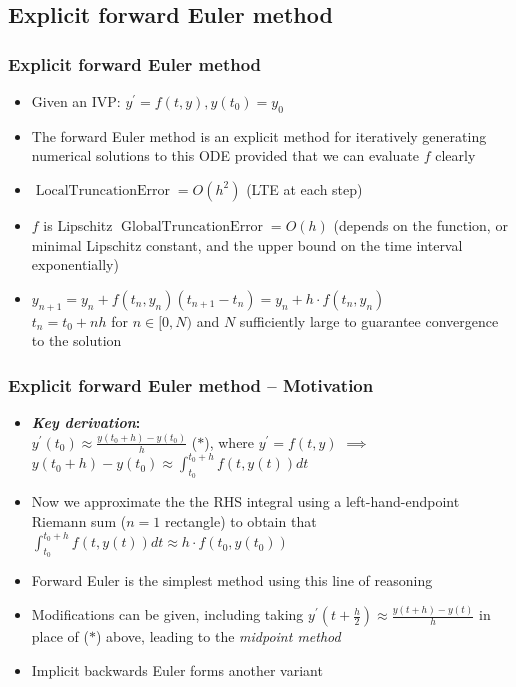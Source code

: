 \documentclass[usenames,svgnames,dvipsnames,10pt]{beamer}
\begin{document}
\subsection{Explicit forward Euler method}

\begin{frame}
\frametitle{Explicit forward Euler method}

\begin{itemize} 

\item Given an IVP: $y^{\prime} = f(t, y), y(t_0) = y_0$ 
\item The forward Euler method is an explicit method for iteratively 
      generating numerical solutions to this ODE provided that we can 
      evaluate $f$ clearly 
\item $\operatorname{LocalTruncationError} = O(h^2)$ (LTE at each step) 
\item $f$ is Lipschitz $\operatorname{GlobalTruncationError} = O(h)$ 
       (depends on the function, or minimal Lipschitz constant, and the upper bound on the 
       time interval exponentially) 
\item $y_{n+1} = y_n + f(t_n, y_n) \left(t_{n+1} - t_n\right) = y_n + h \cdot f(t_n, y_n)$ \\ 
      $t_n = t_0 + nh$ for $n \in [0, N)$ and $N$ sufficiently large to guarantee convergence 
      to the solution 

\end{itemize} 

\end{frame}

\begin{frame}
\frametitle{Explicit forward Euler method -- Motivation}

\begin{itemize} 

\item \textbf{\emph{Key derivation}:} \\ 
      $y^{\prime}(t_0) \approx \frac{y(t_0+h)-y(t_0)}{h}$ ($\ast$), where 
      $y^{\prime} = f(t, y)$ $\implies$ $y(t_0+h)-y(t_0) \approx \int_{t_0}^{t_0+h} f(t, y(t)) dt$ 
\item Now we approximate the the RHS integral using a left-hand-endpoint Riemann sum ($n=1$ rectangle) to 
      obtain that $\int_{t_0}^{t_0+h} f(t, y(t)) dt \approx h \cdot f(t_0, y(t_0))$
\item Forward Euler is the simplest method using this line of reasoning 
\item Modifications can be given, including 
      taking $y^{\prime}\left(t + \frac{h}{2}\right) \approx \frac{y(t+h)-y(t)}{h}$ in place of ($\ast$) above, 
      leading to the \emph{midpoint method} 
\item Implicit backwards Euler forms another variant 

\end{itemize} 

\end{frame}
\end{document}
